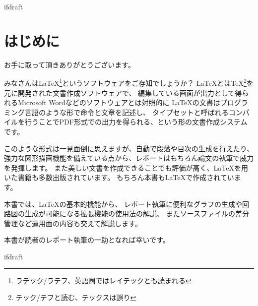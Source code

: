 \expandafter\ifx\csname ifdraft\endcsname\relax
    
	
\fi

\chapter{はじめに}
	お手に取って頂きありがとうございます。

	みなさんは\LaTeX \footnote{ラテック/ラテフ、英語圏ではレイテックとも読まれる}というソフトウェアをご存知でしょうか？
	\LaTeX とは\TeX \footnote{テック/テフと読む、テックスは誤り}を元に開発された文書作成ソフトウェアで、
	編集している画面が出力として得られるMicrosoft Wordなどのソフトウェアとは対照的に
	\LaTeX の文書はプログラミング言語のような形で命令と文章を記述し、
	タイプセットと呼ばれるコンパイルを行うことでPDF形式での出力を得られる、という形の文書作成システムです。

	このような形式は一見面倒に思えますが、自動で段落や目次の生成を行えたり、
	強力な図形描画機能を備えている点から、レポートはもちろん論文の執筆で威力を発揮します。
	また美しい文書を作成できることでも評価が高く、\LaTeX を用いた書籍も多数出版されています。
	もちろん本書も\LaTeX で作成されています。

	本書では、\LaTeX の基本的機能から、
	レポート執筆に便利なグラフの生成や回路図の生成が可能になる拡張機能の使用法の解説、
	またソースファイルの差分管理など運用面の内容も交えて解説します。

	本書が読者のレポート執筆の一助となれば幸いです。


\expandafter\ifx\csname ifdraft\endcsname\relax
	
\fi